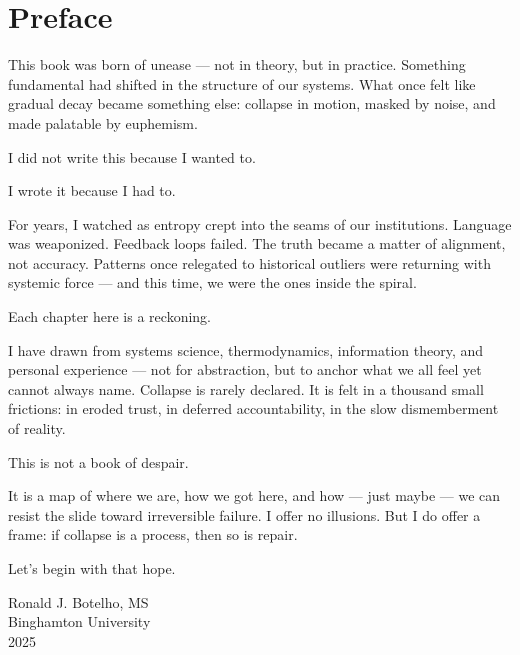 \chapter*{Preface}

This book was born of unease — not in theory, but in practice. Something fundamental had shifted in the structure of our systems. What once felt like gradual decay became something else: collapse in motion, masked by noise, and made palatable by euphemism.

I did not write this because I wanted to.

I wrote it because I had to.

For years, I watched as entropy crept into the seams of our institutions. Language was weaponized. Feedback loops failed. The truth became a matter of alignment, not accuracy. Patterns once relegated to historical outliers were returning with systemic force — and this time, we were the ones inside the spiral.

Each chapter here is a reckoning.

I have drawn from systems science, thermodynamics, information theory, and personal experience — not for abstraction, but to anchor what we all feel yet cannot always name. Collapse is rarely declared. It is felt in a thousand small frictions: in eroded trust, in deferred accountability, in the slow dismemberment of reality.

This is not a book of despair.

It is a map of where we are, how we got here, and how — just maybe — we can resist the slide toward irreversible failure. I offer no illusions. But I do offer a frame: if collapse is a process, then so is repair.

Let’s begin with that hope.

\begin{flushright}
Ronald J. Botelho, MS\\
Binghamton University\\
2025
\end{flushright}

